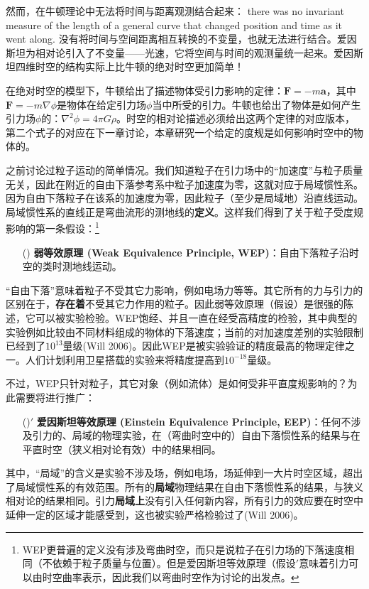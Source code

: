 然而，在牛顿理论中无法将时间与距离观测结合起来： there was no invariant measure of the length of a general curve that changed position and time as it went along. 没有将时间与空间距离相互转换的不变量，也就无法进行结合。爱因斯坦为相对论引入了不变量——光速，它将空间与时间的观测量统一起来。爱因斯坦四维时空的结构实际上比牛顿的绝对时空更加简单！

在绝对时空的模型下，牛顿给出了描述物体受引力影响的定律：$\bm{F} = -m \bm{a}$，其中$\bm{F} = -m \nabla \phi$是物体在给定引力场$\phi$当中所受的引力。牛顿也给出了物体是如何产生引力场$\phi$的：$\nabla^2 \phi = 4\pi G \rho$。时空的相对论描述必须给出这两个定律的对应版本，第二个式子的对应在下一章讨论，本章研究一个给定的度规是如何影响时空中的物体的。

之前讨论过粒子运动的简单情况。我们知道粒子在引力场中的“加速度”与粒子质量无关，因此在附近的自由下落参考系中粒子加速度为零，这就对应于局域惯性系。因为自由下落粒子在该系的加速度为零，因此粒子（至少是局域地）沿直线运动。局域惯性系的直线正是弯曲流形的测地线的\textbf{定义}。这样我们得到了关于粒子受度规影响的第一条假设：\footnote{WEP更普遍的定义没有涉及弯曲时空，而只是说粒子在引力场的下落速度相同（不依赖于粒子质量与位置）。但是爱因斯坦等效原理（假设\uppercase\expandafter{}$'$意味着引力可以由时空曲率表示，因此我们以弯曲时空作为讨论的出发点。}

\begin{shaded}
\begin{enumerate}
    \item[(\uppercase\expandafter{\romannumeral4})] \textbf{弱等效原理 (Weak Equivalence Principle, WEP)}：自由下落粒子沿时空的类时测地线运动。
\end{enumerate}
\end{shaded}
“自由下落”意味着粒子不受其它力影响，例如电场力等等。其它所有的力与引力的区别在于，\textbf{存在着}不受其它力作用的粒子。因此弱等效原理（假设\uppercase\expandafter{}）是很强的陈述，它可以被实验检验。WEP饱经、并且一直在经受高精度的检验，其中典型的实验例如比较由不同材料组成的物体的下落速度；当前的对加速度差别的实验限制已经到了$10^{13}$量级(Will 2006)。因此WEP是被实验验证的精度最高的物理定律之一。人们计划利用卫星搭载的实验来将精度提高到$10^{-18}$量级。

不过，WEP只针对粒子，其它对象（例如流体）是如何受非平直度规影响的？为此需要将\uppercase\expandafter{}进行推广：

\begin{shaded}
\begin{enumerate}
    \item[(\uppercase\expandafter{\romannumeral4})$'$] \textbf{爱因斯坦等效原理 (Einstein Equivalence Principle, EEP)}：任何不涉及引力的、局域的物理实验，在（弯曲时空中的）自由下落惯性系的结果与在平直时空（狭义相对论有效）中的结果相同。
\end{enumerate}
\end{shaded}
其中，“局域”的含义是实验不涉及场，例如电场，场延伸到一大片时空区域，超出了局域惯性系的有效范围。所有的\textbf{局域}物理结果在自由下落惯性系的结果，与狭义相对论的结果相同。引力\textbf{局域上}没有引入任何新内容，所有引力的效应要在时空中延伸一定的区域才能感受到，这也被实验严格检验过了(Will 2006)。

